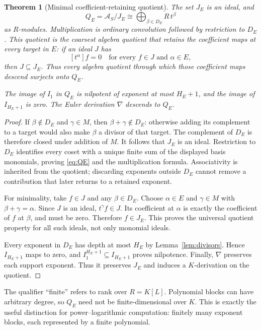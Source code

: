 \documentclass[11pt,a4paper]{article}
\newtheorem{theorem}{Theorem}[section]
\theoremstyle{definition}
\theoremstyle{remark}
\newcommand{\AS}{\mathscr A_S}
\newcommand{\coef}[1]{\left[#1\right]}
\begin{document}
\begin{theorem}[Minimal coefficient-retaining quotient]
\label{thm:minquotient}
The set $J_E$ is an ideal, and
\begin{equation}\label{eq:QE}
 Q_E=\AS/J_E
 \cong\bigoplus_{\beta\in D_E}R\,t^\beta
\end{equation}
as $R$-modules. Multiplication is ordinary convolution followed by
restriction to $D_E$. This quotient is the coarsest algebra quotient that
retains the coefficient maps at every target in $E$: if an ideal $J$ has
\[
 \coef{t^\alpha}f=0\quad\text{for every }f\in J\text{ and }\alpha\in E,
\]
then $J\subseteq J_E$. Thus every algebra quotient through which those
coefficient maps descend surjects onto $Q_E$.

The image of $I_1$ in $Q_E$ is nilpotent of exponent at most $H_E+1$, and
the image of $I_{H_E+1}$ is zero. The Euler derivation $\nabla$ descends
to $Q_E$.
\end{theorem}
\begin{proof}
If $\beta\notin D_E$ and $\gamma\in M$, then
$\beta+\gamma\notin D_E$: otherwise adding its complement to a target
would also make $\beta$ a divisor of that target. The complement of $D_E$
is therefore closed under addition of $M$. It follows that $J_E$ is an
ideal. Restriction to $D_E$ identifies every coset with a unique finite
sum of the displayed basis monomials, proving \eqref{eq:QE} and the
multiplication formula. Associativity is inherited from the quotient;
discarding exponents outside $D_E$ cannot remove a contribution that later
returns to a retained exponent.

For minimality, take $f\in J$ and any $\beta\in D_E$. Choose
$\alpha\in E$ and $\gamma\in M$ with $\beta+\gamma=\alpha$.
Since $J$ is an ideal, $t^\gamma f\in J$. Its coefficient at $\alpha$
is exactly the coefficient of $f$ at $\beta$, and must be zero. Therefore
$f\in J_E$. This proves the universal quotient property for all such
ideals, not only monomial ideals.

Every exponent in $D_E$ has depth at most $H_E$ by
Lemma~\ref{lem:divisors}. Hence $I_{H_E+1}$ maps to zero, and
$I_1^{H_E+1}\subseteq I_{H_E+1}$ proves nilpotence.
Finally, $\nabla$ preserves each support exponent. Thus it preserves
$J_E$ and induces a $K$-derivation on the quotient.
\end{proof}

The qualifier ``finite'' refers to rank over $R=K[L]$. Polynomial blocks
can have arbitrary degree, so $Q_E$ need not be finite-dimensional over
$K$. This is exactly the useful distinction for power--logarithmic
computation: finitely many exponent blocks, each represented by a finite
polynomial.
\end{document}
